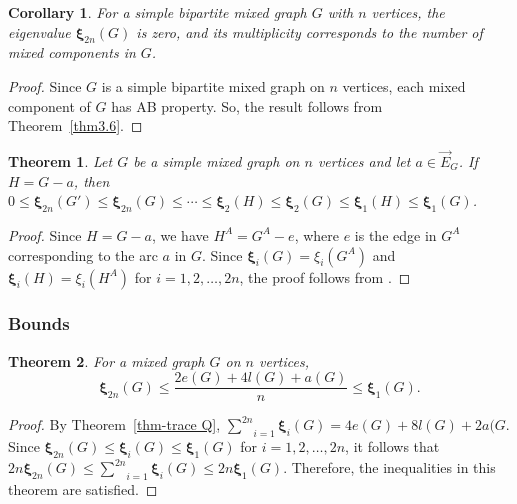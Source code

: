 \documentclass[12pt]{article}
\numberwithin{equation}{section}
\newtheorem{thm}{Theorem}[section]
\newtheorem{cor}{Corollary}[section]
\begin{document}
	\begin{cor}
	For a simple bipartite mixed graph $ G $ with $ n $ vertices, the eigenvalue $ \bm{\xi}_{2n}(G) $ is zero, and its multiplicity corresponds to the number of mixed components in $ G $.
	\end{cor}
	\begin{proof}
		Since $G$ is a simple bipartite mixed graph on $n$ vertices, 
		each mixed component of $G$ has AB property.
		So, the result follows from Theorem~\ref{thm3.6}.
	\end{proof}
	
	\begin{thm}
		Let $G$ be a simple mixed graph on $n$ vertices and let $a\in \vec{E}_G$. If $H=G-a$, then $0\leq\bm{\xi}_{2n}(G')\leq\bm{\xi}_{2n}(G)\leq\cdots\leq\bm{\xi}_{2}(H)\leq\bm{\xi}_{2}(G)\leq\bm{\xi}_{1}(H)\leq\bm{\xi}_{1}(G)$.
	\end{thm}
	\begin{proof}
		Since $H=G-a$, we have ${H}^A=G^A-e$, where $e$ is the edge in $G^A$ corresponding to the arc $a$ in $G$. Since $\bm{\xi}_{i}(G)=\xi_{i}(G^A)$ and $\bm{\xi}_{i}(H)=\xi_{i}(H^A)$ for $i=1,2,\ldots,2n$, the proof follows from \cite[Theorem~7.8.13]{cvetkovic}.
%		
	\end{proof}
	
	\subsubsection{Bounds}
	
	\begin{thm}
		For a mixed graph $G$ on $n$ vertices,
		$$\bm{\xi}_{2n}(G)\leq\frac{2e(G)+4l(G)+a(G)}{n}\leq\bm{\xi}_{1}(G).$$ 
	\end{thm}
	\begin{proof}
		By Theorem~\ref{thm-trace Q}, $\underset{i=1}{\overset{2n}{\sum}}\bm{\xi}_i(G)=4e(G)+8l(G)+2a(G$. Since $\bm{\xi}_{2n}(G)\leq\bm{\xi}_i(G)\leq\bm{\xi}_1(G)$ for $i=1,2,\ldots,2n$, it follows that $2n\bm{\xi}_{2n}(G)\leq\underset{i=1}{\overset{2n}{\sum}}\bm{\xi}_i(G)\leq2n\bm{\xi}_1(G)$. Therefore, the inequalities in this theorem are satisfied.
	\end{proof}
	
\end{document}
